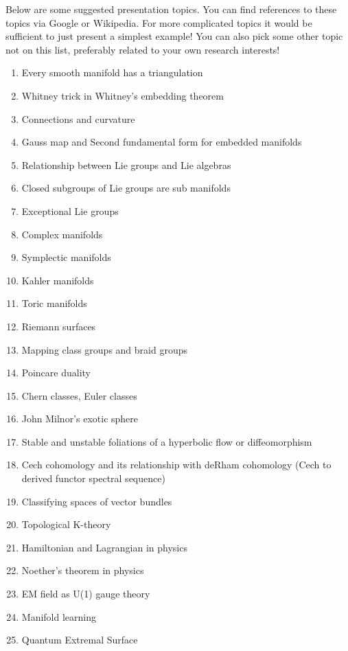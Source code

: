 \documentclass{article}
\theoremstyle{definition}
\begin{document}
Below are some suggested presentation topics. You can find references to these topics via Google or Wikipedia. For more complicated topics it would be sufficient to just present a simplest example! You can also pick some other topic not on this list, preferably related to your own research interests!

\begin{enumerate}
\item Every smooth manifold has a triangulation
\item Whitney trick in Whitney’s embedding theorem
\item Connections and curvature
\item Gauss map and Second fundamental form for embedded manifolds
\item Relationship between Lie groups and Lie algebras
\item Closed subgroups of Lie groups are sub manifolds
\item Exceptional Lie groups
\item Complex manifolds
\item Symplectic manifolds 
\item Kahler manifolds
\item Toric manifolds
\item Riemann surfaces
\item Mapping class groups and braid groups
\item Poincare duality
\item Chern classes, Euler classes
\item John Milnor’s exotic sphere
\item Stable and unstable foliations of a hyperbolic flow or diffeomorphism
\item Cech cohomology and its relationship with deRham cohomology (Cech to derived functor spectral sequence)
\item Classifying spaces of vector bundles
\item Topological K-theory
\item Hamiltonian and Lagrangian in physics
\item Noether’s theorem in physics
\item EM field as U(1) gauge theory 
\item Manifold learning
\item Quantum Extremal Surface
\end{enumerate}
\end{document}
